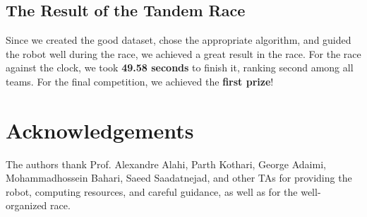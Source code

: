 \documentclass[10pt,conference,compsocconf]{IEEEtran}
\begin{document}
\subsection{The Result of the Tandem Race}
Since we created the good dataset, chose the appropriate algorithm, and guided the robot well during the race, we achieved a great result in the race. For the race against the clock, we took \textbf{49.58 seconds} to finish it, ranking second among all teams. For the final competition, we achieved the \textbf{first prize}!




\section*{Acknowledgements}
The authors thank Prof. Alexandre Alahi, Parth Kothari, George Adaimi, Mohammadhossein Bahari, Saeed Saadatnejad, and other TAs for providing the robot, computing resources, and careful guidance, as well as for the well-organized race.

\newpage
\onecolumn



\end{document}
